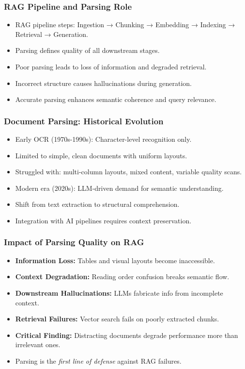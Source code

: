 \begin{frame}[fragile]\frametitle{RAG Pipeline and Parsing Role}
      \begin{itemize}
        \item RAG pipeline steps: Ingestion → Chunking → Embedding → Indexing → Retrieval → Generation.
        \item Parsing defines quality of all downstream stages.
        \item Poor parsing leads to loss of information and degraded retrieval.
        \item Incorrect structure causes hallucinations during generation.
        \item Accurate parsing enhances semantic coherence and query relevance.
      \end{itemize}
\end{frame}

\begin{frame}[fragile]\frametitle{Document Parsing: Historical Evolution}
      \begin{itemize}
        \item Early OCR (1970s-1990s): Character-level recognition only.
        \item Limited to simple, clean documents with uniform layouts.
        \item Struggled with: multi-column layouts, mixed content, variable quality scans.
        \item Modern era (2020s): LLM-driven demand for semantic understanding.
        \item Shift from text extraction to structural comprehension.
        \item Integration with AI pipelines requires context preservation.
      \end{itemize}
\end{frame}

\begin{frame}[fragile]\frametitle{Impact of Parsing Quality on RAG}
      \begin{itemize}
        \item \textbf{Information Loss:} Tables and visual layouts become inaccessible.
        \item \textbf{Context Degradation:} Reading order confusion breaks semantic flow.
        \item \textbf{Downstream Hallucinations:} LLMs fabricate info from incomplete context.
        \item \textbf{Retrieval Failures:} Vector search fails on poorly extracted chunks.
        \item \textbf{Critical Finding:} Distracting documents degrade performance more than irrelevant ones.
        \item Parsing is the \textit{first line of defense} against RAG failures.
      \end{itemize}
\end{frame}

